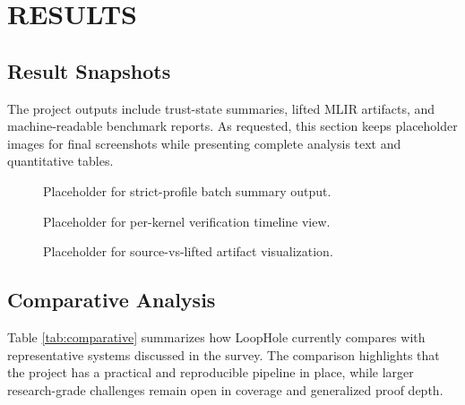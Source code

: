 \chapter{RESULTS}
\section{Result Snapshots}
The project outputs include trust-state summaries, lifted MLIR artifacts, and machine-readable benchmark reports. As requested, this section keeps placeholder images for final screenshots while presenting complete analysis text and quantitative tables.

\begin{figure}[H]
    \centering
    \caption{Placeholder for strict-profile batch summary output.}
    \label{fig:result_placeholder_1}
\end{figure}

\begin{figure}[H]
    \centering
    \caption{Placeholder for per-kernel verification timeline view.}
    \label{fig:result_placeholder_2}
\end{figure}

\begin{figure}[H]
    \centering
    \caption{Placeholder for source-vs-lifted artifact visualization.}
    \label{fig:result_placeholder_3}
\end{figure}

\section{Comparative Analysis}
Table \ref{tab:comparative} summarizes how LoopHole currently compares with representative systems discussed in the survey. The comparison highlights that the project has a practical and reproducible pipeline in place, while larger research-grade challenges remain open in coverage and generalized proof depth.

